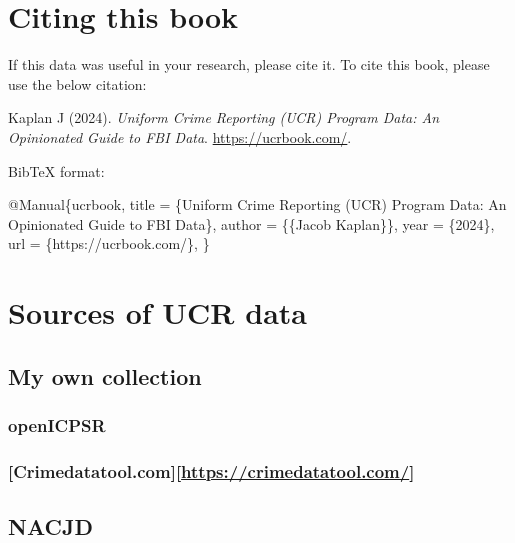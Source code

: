 \documentclass[
]{krantz}
\makeatletter
\newenvironment{Shaded}{\begin{snugshade}}{\end{snugshade}}
\newcommand{\DataTypeTok}[1]{\textcolor[rgb]{0.27,0.27,0.27}{#1}}
\newcommand{\NormalTok}[1]{#1}
\newcommand{\OtherTok}[1]{\textcolor[rgb]{0.37,0.37,0.37}{#1}}
\newcommand{\VariableTok}[1]{\textcolor[rgb]{0,0,0}{#1}}
\newenvironment{kframe}{%
\medskip{}
\setlength{\fboxsep}{.8em}
 \def\at@end@of@kframe{}%
 \ifinner\ifhmode%
  \def\at@end@of@kframe{\end{minipage}}%
  \begin{minipage}{\columnwidth}%
 \fi\fi%
 \def\FrameCommand##1{\hskip\@totalleftmargin \hskip-\fboxsep
 \colorbox{shadecolor}{##1}\hskip-\fboxsep
     \hskip-\linewidth \hskip-\@totalleftmargin \hskip\columnwidth}%
 \MakeFramed {\advance\hsize-\width
   \@totalleftmargin\z@ \linewidth\hsize
   \@setminipage}}%
 {\par\unskip\endMakeFramed%
 \at@end@of@kframe}
\renewenvironment{Shaded}{\begin{kframe}}{\end{kframe}}
\makeatother
\begin{document}
\section{Citing this book}\label{citing-this-book}

If this data was useful in your research, please cite it. To
cite this book, please use the below citation:

Kaplan J (2024). \emph{Uniform Crime Reporting (UCR) Program
Data: An Opinionated Guide to FBI Data}.
\url{https://ucrbook.com/}.

BibTeX format:

\begin{Shaded}
\begin{Highlighting}[]
\VariableTok{@Manual}\NormalTok{\{}\OtherTok{ucrbook}\NormalTok{,}
  \DataTypeTok{title}\NormalTok{ = \{Uniform Crime Reporting (UCR) Program Data: An Opinionated Guide to FBI Data\},}
  \DataTypeTok{author}\NormalTok{ = \{\{Jacob Kaplan\}\},}
  \DataTypeTok{year}\NormalTok{ = \{2024\},}
  \DataTypeTok{url}\NormalTok{ = \{https://ucrbook.com/\},}
\NormalTok{\}}
\end{Highlighting}
\end{Shaded}

\section{Sources of UCR data}\label{sources-of-ucr-data}

\subsection{My own collection}\label{my-own-collection}

\subsubsection{openICPSR}\label{openicpsr}

\subsubsection{\texorpdfstring{{[}Crimedatatool.com{]}{[}\url{https://crimedatatool.com/}{]}}{{[}Crimedatatool.com{]}{[}https://crimedatatool.com/{]}}}\label{crimedatatool.comhttpscrimedatatool.com}

\subsection{NACJD}\label{nacjd}
\end{document}
